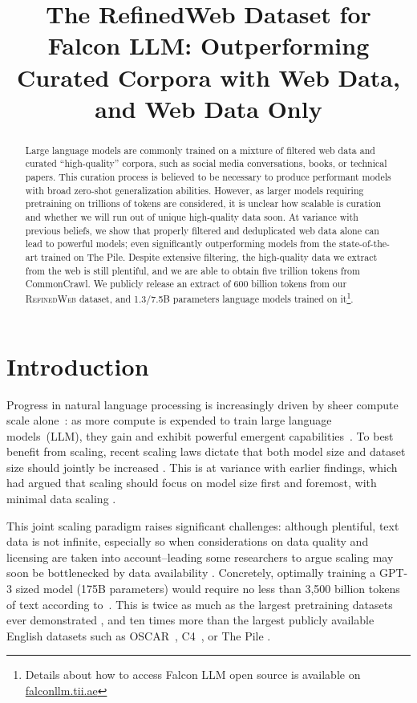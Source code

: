 \title{The RefinedWeb Dataset for Falcon LLM: Outperforming Curated Corpora with Web Data, and Web Data Only}

\begin{abstract}
Large language models are commonly trained on a mixture of filtered web data and curated ``high-quality'' corpora, such as social media conversations, books, or technical papers. This curation process is believed to be necessary to produce performant models with broad zero-shot generalization abilities. However, as larger models requiring pretraining on trillions of tokens are considered, it is unclear how scalable is curation and whether we will run out of unique high-quality data soon.  At variance with previous beliefs, we show that properly filtered and deduplicated web data alone can lead to powerful models; even significantly outperforming models from the state-of-the-art trained on The Pile. Despite extensive filtering, the high-quality data we extract from the web is still plentiful, and we are able to obtain five trillion tokens from CommonCrawl. We publicly release an extract of 600 billion tokens from our \textsc{RefinedWeb} dataset, and 1.3/7.5B parameters language models trained on it\footnote{Details about how to access Falcon LLM open source is available on \url{falconllm.tii.ae}}.
\end{abstract}

\section{Introduction}
\label{sec:introduction}

Progress in natural language processing is increasingly driven by sheer compute scale alone~\cite{sevilla2022compute}: as more compute is expended to train large language models~(LLM), they gain and exhibit powerful emergent capabilities~\cite{brown2020language, weiemergent}. To best benefit from scaling, recent scaling laws dictate that both model size and dataset size should jointly be increased \cite{hoffmann2022training}. This is at variance with earlier findings, which had argued that scaling should focus on model size first and foremost, with minimal data scaling \cite{kaplan2020scaling}.

This joint scaling paradigm raises significant challenges: although plentiful, text data is not infinite, especially so when considerations on data quality and licensing are taken into account--leading some researchers to argue scaling may soon be bottlenecked by data availability \cite{villalobos2022will}. Concretely, optimally training a GPT-3 sized model (175B parameters) would require no less than 3,500 billion tokens of text according to~\citet{hoffmann2022training}. This is twice as much as the largest pretraining datasets ever demonstrated \cite{hoffmann2022training, touvron2023llama}, and ten times more than the largest publicly available English datasets such as OSCAR~\cite{OrtizSuarezSagotRomary2019}, C4~\cite{2020t5}, or The Pile \cite{gao2020pile}.  


